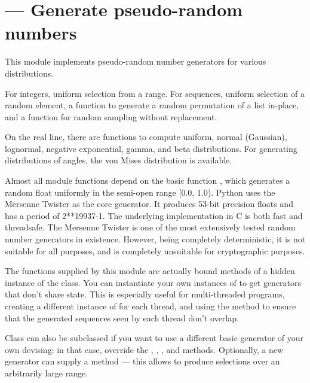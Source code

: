 \section{ ---
         Generate pseudo-random numbers}



This module implements pseudo-random number generators for various
distributions.

For integers, uniform selection from a range.
For sequences, uniform selection of a random element, a function to
generate a random permutation of a list in-place, and a function for
random sampling without replacement.

On the real line, there are functions to compute uniform, normal (Gaussian),
lognormal, negative exponential, gamma, and beta distributions.
For generating distributions of angles, the von Mises distribution
is available.

Almost all module functions depend on the basic function
, which generates a random float uniformly in
the semi-open range [0.0, 1.0).  Python uses the Mersenne Twister as
the core generator.  It produces 53-bit precision floats and has a
period of 2**19937-1.  The underlying implementation in C 
is both fast and threadsafe.  The Mersenne Twister is one of the most
extensively tested random number generators in existence.  However, being
completely deterministic, it is not suitable for all purposes, and is
completely unsuitable for cryptographic purposes.

The functions supplied by this module are actually bound methods of a
hidden instance of the  class.  You can
instantiate your own instances of  to get generators
that don't share state.  This is especially useful for multi-threaded
programs, creating a different instance of  for each
thread, and using the  method to ensure that the
generated sequences seen by each thread don't overlap.

Class  can also be subclassed if you want to use a
different basic generator of your own devising: in that case, override
the , , ,
 and  methods.
Optionally, a new generator can supply a 
method --- this allows  to produce selections
over an arbitrarily large range.


